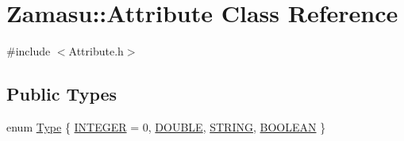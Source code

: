 \hypertarget{class_zamasu_1_1_attribute}{}\section{Zamasu\+:\+:Attribute Class Reference}
\label{class_zamasu_1_1_attribute}


{\ttfamily \#include $<$Attribute.\+h$>$}

\subsection*{Public Types}
\begin{DoxyCompactItemize}
\item 
enum \hyperlink{class_zamasu_1_1_attribute_a66388c5c47bcf3854194c897acb5c7cd}{Type} \{ \hyperlink{class_zamasu_1_1_attribute_a66388c5c47bcf3854194c897acb5c7cdaef67102a1bf3da84ace5b1ac4da8de98}{I\+N\+T\+E\+G\+ER} = 0, 
\hyperlink{class_zamasu_1_1_attribute_a66388c5c47bcf3854194c897acb5c7cda76074a45223318059bf97b2781e098c1}{D\+O\+U\+B\+LE}, 
\hyperlink{class_zamasu_1_1_attribute_a66388c5c47bcf3854194c897acb5c7cda0eeb41ac7d71a5fc2e24790242cac92f}{S\+T\+R\+I\+NG}, 
\hyperlink{class_zamasu_1_1_attribute_a66388c5c47bcf3854194c897acb5c7cdaeefe5afad128a6bdabaa10ba81be2a56}{B\+O\+O\+L\+E\+AN}
 \}
\end{DoxyCompactItemize}
